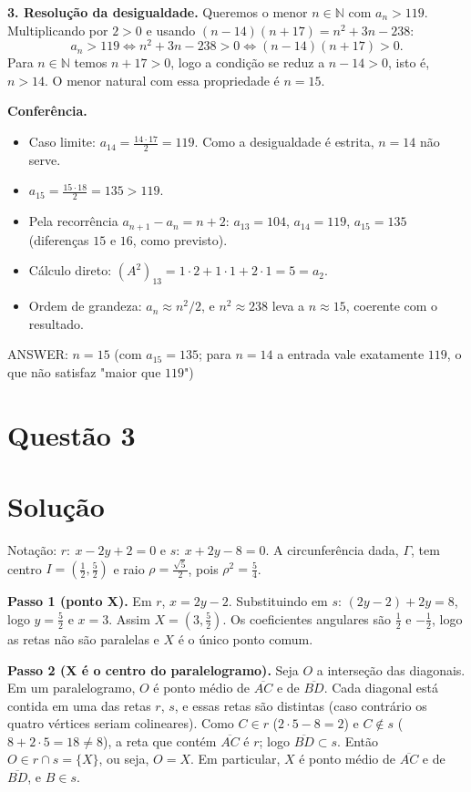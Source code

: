 \documentclass{article}%
\begin{document}
\textbf{3. Resolução da desigualdade.} Queremos o menor $n\in\mathbb{N}$ com $a_n>119$. Multiplicando por $2>0$ e usando $(n-14)(n+17)=n^2+3n-238$:
\begin{equation*}
a_n>119 \iff n^2+3n-238>0 \iff (n-14)(n+17)>0.
\end{equation*}
Para $n\in\mathbb{N}$ temos $n+17>0$, logo a condição se reduz a $n-14>0$, isto é, $n>14$. O menor natural com essa propriedade é $n=15$.

\textbf{Conferência.}
\begin{itemize}
\item Caso limite: $a_{14}=\frac{14\cdot 17}{2}=119$. Como a desigualdade é estrita, $n=14$ não serve.
\item $a_{15}=\frac{15\cdot 18}{2}=135>119$.
\item Pela recorrência $a_{n+1}-a_n=n+2$: $a_{13}=104$, $a_{14}=119$, $a_{15}=135$ (diferenças $15$ e $16$, como previsto).
\item Cálculo direto: $(A^2)_{13}=1\cdot 2+1\cdot 1+2\cdot 1=5=a_2$.
\item Ordem de grandeza: $a_n\approx n^2/2$, e $n^2\approx 238$ leva a $n\approx 15$, coerente com o resultado.
\end{itemize}

ANSWER: $n = 15$ (com $a_{15}=135$; para $n=14$ a entrada vale exatamente $119$, o que não satisfaz "maior que $119$")%
\newpage%
\section*{Questão 3}

\section*{Solução}

Notação: $r:\ x-2y+2=0$ e $s:\ x+2y-8=0$. A circunferência dada, $\Gamma$, tem centro $I=\left(\tfrac12,\tfrac52\right)$ e raio $\rho=\tfrac{\sqrt5}{2}$, pois $\rho^2=\tfrac54$.

\textbf{Passo 1 (ponto X).} Em $r$, $x=2y-2$. Substituindo em $s$: $(2y-2)+2y=8$, logo $y=\tfrac52$ e $x=3$. Assim $X=\left(3,\tfrac52\right)$. Os coeficientes angulares são $\tfrac12$ e $-\tfrac12$, logo as retas não são paralelas e $X$ é o único ponto comum.

\textbf{Passo 2 (X é o centro do paralelogramo).} Seja $O$ a interseção das diagonais. Em um paralelogramo, $O$ é ponto médio de $\overline{AC}$ e de $\overline{BD}$. Cada diagonal está contida em uma das retas $r$, $s$, e essas retas são distintas (caso contrário os quatro vértices seriam colineares). Como $C\in r$ ($2\cdot5-8=2$) e $C\notin s$ ($8+2\cdot5=18\neq8$), a reta que contém $\overline{AC}$ é $r$; logo $\overline{BD}\subset s$. Então $O\in r\cap s=\{X\}$, ou seja, $O=X$. Em particular, $X$ é ponto médio de $\overline{AC}$ e de $\overline{BD}$, e $B\in s$.
\end{document}
